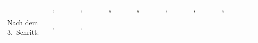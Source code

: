 \begin{tabular}{m{30mm}m{11mm}m{11mm}m{11mm}m{11mm}m{11mm}m{11mm}m{11mm}m{11mm}}
&
\includegraphics[width=0.08\textwidth]{./inf/SEKII/19_Java_Sortierverfahren/Pik10.png}
&
\includegraphics[width=0.08\textwidth]{./inf/SEKII/19_Java_Sortierverfahren/Pik7.png}
&
\includegraphics[width=0.08\textwidth]{./inf/SEKII/19_Java_Sortierverfahren/PikBube.png}
&
\includegraphics[width=0.08\textwidth]{./inf/SEKII/19_Java_Sortierverfahren/PikDame.png}
&
\includegraphics[width=0.08\textwidth]{./inf/SEKII/19_Java_Sortierverfahren/Pik9.png}
&
\includegraphics[width=0.08\textwidth]{./inf/SEKII/19_Java_Sortierverfahren/PikKoenig.png}
&
\includegraphics[width=0.08\textwidth]{./inf/SEKII/19_Java_Sortierverfahren/PikAs.png}
\\
Nach dem 3.\ Schritt: &
\includegraphics[width=0.08\textwidth]{./inf/SEKII/19_Java_Sortierverfahren/Pik8.png}
&
\includegraphics[width=0.08\textwidth]{./inf/SEKII/19_Java_Sortierverfahren/Pik7.png}

\end{tabular}
